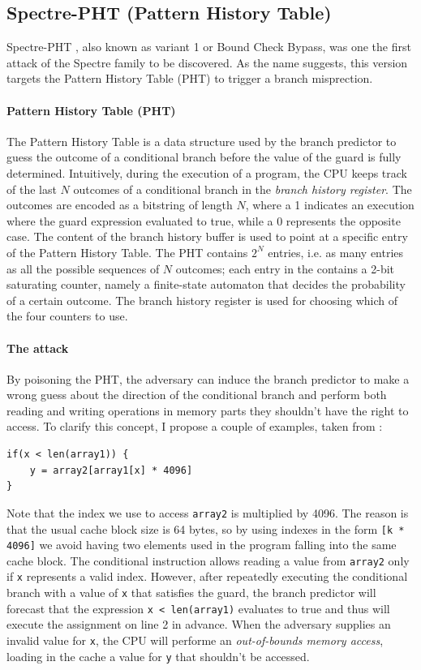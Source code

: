 \documentclass[12pt,a4paper]{book}
\theoremstyle{definition}
\begin{document}
	\subsection{Spectre-PHT (Pattern History Table)}\label{sec:spectre-pht}
	Spectre-PHT \cite{Kocher2019}\cite{Canella2019}\cite{Evtyushkin2018}, also known as variant 1 or Bound Check Bypass, was one the first attack of the Spectre family to be discovered. As the name suggests, this version targets the Pattern History Table (PHT) to trigger a branch misprection.
	\paragraph{Pattern History Table (PHT)} The Pattern History Table \cite{Fog2021} is a data structure used by the branch predictor to guess the outcome of a conditional branch before the value of the guard is fully determined. Intuitively, during the execution of a program, the CPU keeps track of the last $N$ outcomes of a conditional branch in the \textit{branch history register}. The outcomes are encoded as a bitstring of length $N$, where a 1 indicates an execution where the guard expression evaluated to true, while a 0 represents the opposite case. The content of the branch history buffer is used to point at a specific entry of the Pattern History Table. The PHT contains $2^N$ entries, i.e. as many entries as all the possible sequences of $N$ outcomes; each entry in
	the contains a 2-bit saturating counter, namely a finite-state automaton that decides the probability of a certain outcome. The branch history register is used for choosing which of the four counters to use.
	
	\paragraph{The attack} By poisoning the PHT, the adversary can induce the branch predictor to make a wrong guess about the direction of the conditional branch and perform both reading and writing operations in memory parts they shouldn't have the right to access. To clarify this concept, I propose a couple of examples, taken from \cite{Canella2019}:
	\begin{lstlisting}
if(x < len(array1)) {
	y = array2[array1[x] * 4096]
}
	\end{lstlisting}
	Note that the index we use to access \texttt{array2} is multiplied by 4096. The reason is that the usual cache block size is 64 bytes, so by using indexes in the form \texttt{[k * 4096]} we avoid having two elements used in the program falling into the same cache block.
	The conditional instruction allows reading a value from \texttt{array2} only if \texttt{x} represents a valid index. However, after repeatedly executing the conditional branch with a value of \texttt{x} that satisfies the guard, the branch predictor will forecast that the expression \texttt{x < len(array1)} evaluates to true and thus will execute the assignment on line 2 in advance. When the adversary supplies an invalid value for \texttt{x}, the CPU will performe an \textit{out-of-bounds memory access}, loading in the cache a value for \texttt{y} that shouldn't be accessed.
	
\end{document}
